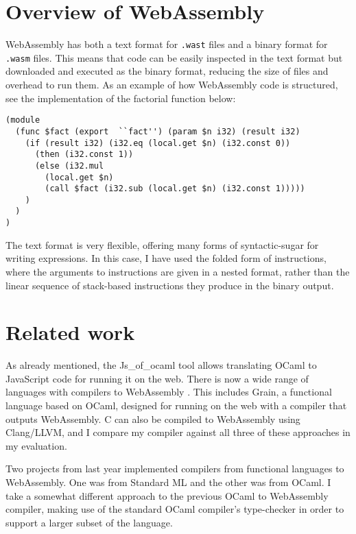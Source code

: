 \section{Overview of WebAssembly}
WebAssembly has both a text format for \verb|.wast| files and a binary format for \verb|.wasm| files. This means that code can be easily inspected in the text format but downloaded and executed as the binary format, reducing the size of files and overhead to run them. As an example of how WebAssembly code is structured, see the implementation of the factorial function below:

\begin{verbatim}
(module
  (func $fact (export  ``fact'') (param $n i32) (result i32)
    (if (result i32) (i32.eq (local.get $n) (i32.const 0))
      (then (i32.const 1))
      (else (i32.mul 
        (local.get $n) 
        (call $fact (i32.sub (local.get $n) (i32.const 1)))))
    )
  )
)
\end{verbatim}

The text format is very flexible, offering many forms of syntactic-sugar for writing expressions. In this case, I have used the folded form of instructions, where the arguments to instructions are given in a nested format, rather than the linear sequence of stack-based instructions they produce in the binary output. 


\section{Related work}
As already mentioned, the Js\_of\_ocaml tool allows translating OCaml to JavaScript code for running it on the web. There is now a wide range of languages with compilers to WebAssembly \cite{langauges-to-wasm}. This includes Grain, a functional language based on OCaml, designed for running on the web with a compiler that outputs WebAssembly. C can also be compiled to WebAssembly using Clang/LLVM, and I compare my compiler against all three of these approaches in my evaluation.

Two projects from last year implemented compilers from functional languages to WebAssembly. One was from Standard ML and the other was from OCaml. I take a somewhat different approach to the previous OCaml to WebAssembly compiler, making use of the standard OCaml compiler's type-checker in order to support a larger subset of the language.
